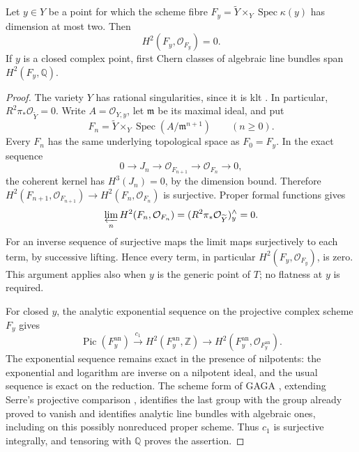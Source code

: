 \begin{lemma}\label{local:scheme-fibre-vanishing}
Let $y\in Y$ be a point for which the scheme fibre
$F_y=\widetilde Y\times_Y\operatorname{Spec}\kappa(y)$ has dimension at
most two.  Then
\[
 H^2(F_y,\mathcal O_{F_y})=0.
\]
If $y$ is a closed complex point, first Chern classes of algebraic line
bundles span $H^2(F_y,\mathbb Q)$.
\end{lemma}

\begin{proof}
The variety $Y$ has rational singularities, since it is klt
\cite[Theorem~5.22]{KM98}.  In particular,
$R^2\pi_*\mathcal O_{\widetilde Y}=0$.  Write
$A=\mathcal O_{Y,y}$, let $\mathfrak m$ be its maximal ideal, and put
\[
 F_n=\widetilde Y\times_Y
       \operatorname{Spec}(A/\mathfrak m^{n+1})\qquad(n\geq0).
\]
Every $F_n$ has the same underlying topological space as $F_0=F_y$.
In the exact sequence
\[
 0\longrightarrow J_n\longrightarrow\mathcal O_{F_{n+1}}
   \longrightarrow\mathcal O_{F_n}\longrightarrow0,
\]
the coherent kernel has $H^3(J_n)=0$, by the dimension bound.
Therefore
$H^2(F_{n+1},\mathcal O_{F_{n+1}})\to
H^2(F_n,\mathcal O_{F_n})$ is surjective.  Proper formal functions
\cite[Tag~02OD]{Stacks} gives
\[
 \varprojlim_n H^2(F_n,\mathcal O_{F_n})
   =(R^2\pi_*\mathcal O_{\widetilde Y})_y^{\wedge}=0.
\]
For an inverse sequence of surjective maps the limit maps
surjectively to each term, by successive lifting.  Hence every term,
in particular $H^2(F_y,\mathcal O_{F_y})$, is zero.  This argument
applies also when $y$ is the generic point of $T$; no flatness at $y$
is required.

For closed $y$, the analytic exponential sequence on the projective
complex scheme $F_y$ gives
\[
 \operatorname{Pic}(F_y^{\mathrm{an}})
  \xrightarrow{\ c_1\ } H^2(F_y^{\mathrm{an}},\mathbb Z)
  \longrightarrow H^2(F_y^{\mathrm{an}},\mathcal O_{F_y^{\mathrm{an}}}).
\]
The exponential sequence remains exact in the presence of nilpotents:
the exponential and logarithm are inverse on a nilpotent ideal, and
the usual sequence is exact on the reduction.  The scheme form of
GAGA \cite[Corollary~4.3 and Theorem~4.4]{RaynaudSGA1XII},
extending Serre's projective comparison \cite{SerreGAGA},
identifies the last group with the group already proved to vanish
and identifies analytic line bundles with algebraic ones, including
on this possibly nonreduced proper scheme. Thus $c_1$ is surjective
integrally, and tensoring with $\mathbb Q$ proves the assertion.
\end{proof}

